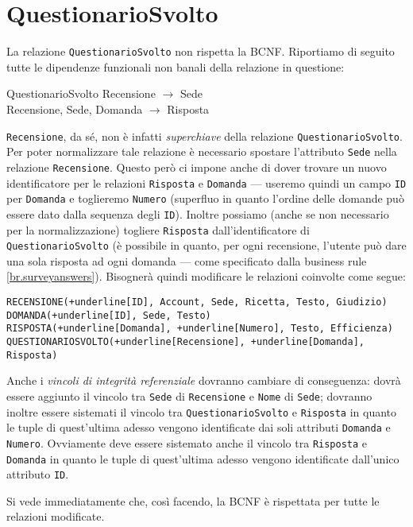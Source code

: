 \section{QuestionarioSvolto}\label{sec:questionariosvolto}
La relazione {\tt QuestionarioSvolto} non rispetta la BCNF. Riportiamo di seguito tutte
le dipendenze funzionali non banali della relazione in questione:
\begin{funcdep}{QuestionarioSvolto}
    Recensione $\to$ Sede\\
    Recensione, Sede, Domanda $\to$ Risposta
\end{funcdep}
\noindent\texttt{Recensione}, da sé, non è infatti {\it superchiave} della relazione {\tt QuestionarioSvolto}. Per
poter normalizzare tale relazione è necessario spostare l'attributo {\tt Sede} nella
relazione {\tt Recensione}. Questo però ci impone anche di dover trovare un nuovo identificatore
per le relazioni {\tt Risposta} e {\tt Domanda} --- useremo quindi un campo {\tt ID} per {\tt Domanda} e
toglieremo {\tt Numero} (superfluo in quanto l'ordine delle domande può essere dato dalla sequenza
degli {\tt ID}). Inoltre possiamo (anche se non necessario per la normalizzazione)
togliere {\tt Risposta} dall'identificatore di {\tt QuestionarioSvolto} (è
possibile in quanto, per ogni recensione, l'utente può dare una sola risposta ad ogni
domanda --- come specificato dalla business rule \ref{br.surveyanswers}). Bisognerà
quindi modificare le relazioni coinvolte come segue:

\begin{Verbatim}[commandchars=+\[\]]
RECENSIONE(+underline[ID], Account, Sede, Ricetta, Testo, Giudizio)
DOMANDA(+underline[ID], Sede, Testo)
RISPOSTA(+underline[Domanda], +underline[Numero], Testo, Efficienza)
QUESTIONARIOSVOLTO(+underline[Recensione], +underline[Domanda], Risposta)
\end{Verbatim}
Anche i {\it vincoli di integrità referenziale} dovranno cambiare di conseguenza: dovrà
essere aggiunto il vincolo tra {\tt Sede} di {\tt Recensione} e {\tt Nome} di {\tt Sede}; dovranno
inoltre essere sistemati il vincolo tra {\tt QuestionarioSvolto} e {\tt Risposta} in quanto le tuple di quest'ultima
adesso vengono identificate dai soli attributi {\tt Domanda} e {\tt Numero}. Ovviamente deve essere
sistemato anche il vincolo tra {\tt Risposta} e {\tt Domanda} in quanto le tuple di quest'ultima adesso
vengono identificate dall'unico attributo {\tt ID}.

\vspace{10pt}
\noindent Si vede immediatamente che, così facendo, la BCNF è rispettata per tutte le relazioni modificate.
